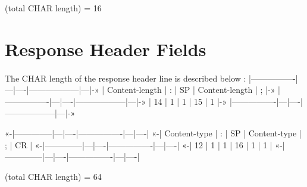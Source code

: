    (total CHAR length) = 16
    \section{Response Header Fields}
        \paragraph{}
   The CHAR length of the response header line is described below :
   |----------------|---|----|------------------|---|-»
   | Content-length | : | SP | {Content-length} | ; |-»
   |----------------|---|----|------------------|---|-»
   |       14       | 1 |  1 |        15        | 1 |-»
   |----------------|---|----|------------------|---|-»

   «-|--------------|---|----|----------------|---|----|
   «-| Content-type | : | SP | {Content-type} | ; | CR |
   «-|--------------|---|----|----------------|---|----|
   «-|      12      | 1 |  1 |       16       | 1 |  1 |
   «-|--------------|---|----|----------------|---|----|

   (total CHAR length) = 64

